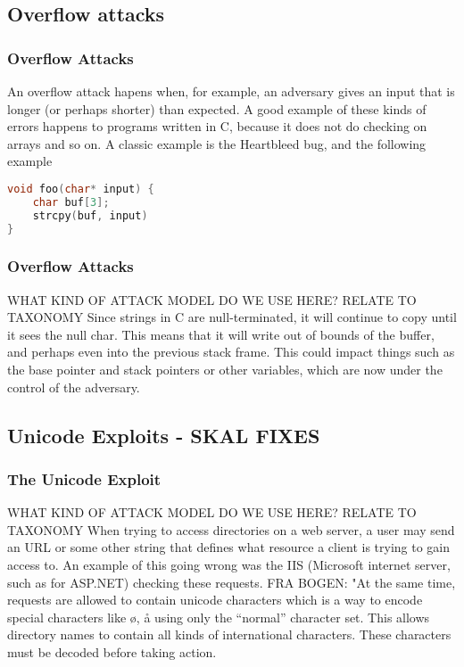 \subsection{Overflow attacks}
\begin{frame}[fragile]
    \frametitle{Overflow Attacks}
        An overflow attack hapens when, for example, an adversary gives an input that is longer (or perhaps shorter) than expected. A good example of these kinds of errors happens to programs written in C, because it does not do checking on arrays and so on. A classic example is the Heartbleed bug, and the following example
        \begin{lstlisting}[language=C, frame=single]
void foo(char* input) {
    char buf[3];
    strcpy(buf, input)
}
        \end{lstlisting}

\end{frame}
    \begin{frame}
        \frametitle{Overflow Attacks}
                WHAT KIND OF ATTACK MODEL DO WE USE HERE? RELATE TO TAXONOMY
            Since strings in C are null-terminated, it will continue to copy until it sees the null char. This means that it will write out of bounds of the buffer, and perhaps even into the previous stack frame. This could impact things such as the base pointer and stack pointers or other variables, which are now under the control of the adversary.
    \end{frame}

    \subsection{Unicode Exploits - SKAL FIXES}
        \begin{frame}
            \frametitle{The Unicode Exploit}
                WHAT KIND OF ATTACK MODEL DO WE USE HERE? RELATE TO TAXONOMY
                When trying to access directories on a web server, a user may send an URL or some other string that defines what resource a client is trying to gain access to. An example of this going wrong was the IIS (Microsoft internet server, such as for ASP.NET) checking these requests. 
                FRA BOGEN:
                "At the same time, requests are allowed to contain unicode characters which is a way to encode special characters like ø, å using only the “normal” character set. This allows directory names to contain all kinds of international characters. These characters must be decoded before taking action.
        \end{frame}

